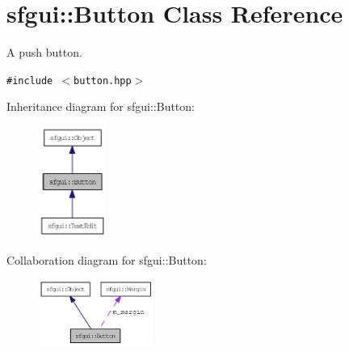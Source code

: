 \hypertarget{classsfgui_1_1Button}{
\section{sfgui::Button Class Reference}
\label{classsfgui_1_1Button}
}
A push button.  


{\tt \#include $<$button.hpp$>$}

Inheritance diagram for sfgui::Button:\nopagebreak
\begin{figure}[H]
\begin{center}
\leavevmode
\includegraphics[width=62pt]{classsfgui_1_1Button__inherit__graph}
\end{center}
\end{figure}
Collaboration diagram for sfgui::Button:\nopagebreak
\begin{figure}[H]
\begin{center}
\leavevmode
\includegraphics[width=106pt]{classsfgui_1_1Button__coll__graph}
\end{center}
\end{figure}
